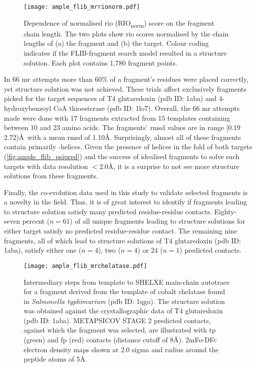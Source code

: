 \begin{figure}[H]
	\centering
	\texttt{[image: ample\_flib\_mrrionorm.pdf]}
	\caption[Relationship between fragment chain length and normalised RIO scores.]{Dependence of normalised \acrlong{rio} (RIO\textsubscript{norm}) score on the fragment chain length. The two plots show  \gls{rio} scores normalised by the chain lengths of (a) the fragment and (b) the target. Colour coding indicates if the FLIB-fragment search model resulted in a structure solution. Each plot contains 1,780 fragment points.}
	\label{fig:ample_flib_mrrionorm}
\end{figure}

In 66 \gls{mr} attempts more than 60\% of a fragment's residues were placed correctly, yet structure solution was not achieved. These trials affect exclusively fragments picked for the target sequences of T4 glutaredoxin (\gls{pdb} ID: 1aba) and 4-hydroxybenzoyl CoA thioesterase (\gls{pdb} ID: 1lo7). Overall, the 66 \gls{mr} attempts made were done with 17 fragments extracted from 15 templates containing between 10 and 23 amino acids. The fragments' \gls{rmsd} values are in range [0.19 2.72)\AA\ with a mean \gls{rmsd} of 1.10\AA. Surprisingly, almost all of these fragments contain primarily \textalpha-helices. Given the presence of helices in the fold of both targets (\cref{fig:ample_flib_psipred}) and the success of idealised fragments to solve such targets with data resolution $<2.0$\AA, it is a surprise to not see more structure solutions from these fragments.

Finally, the co-evolution data used in this study to validate selected fragments is a novelty in the field. Thus, it is of great interest to identify if fragments leading to structure solution satisfy many predicted residue-residue contacts. Eighty-seven percent ($n=61$) of all unique fragments leading to structure solutions for either target satisfy no predicted residue-residue contact. The remaining nine fragments, all of which lead to structure solutions of T4 glutaredoxin (\gls{pdb} ID: 1aba), satisfy either one ($n=4$), two ($n=4$) or 24 ($n=1$) predicted contacts. 

\begin{figure}[H]
	\centering
	\texttt{[image: ample\_flib\_mrchelatase.pdf]}
	\caption[Example of FLIB fragment to MR solution]{Intermediary steps from template to SHELXE main-chain autotrace for a fragment derived from the template of cobalt chelatase found in \textit{Salmonella typhimurium} (\gls{pdb} ID: 1qgo). The structure solution was obtained against the crystallographic data of T4 glutaredoxin (\gls{pdb} ID: 1aba). METAPSICOV STAGE 2 predicted contacts, against which the fragment was selected, are illustrated with \acrlong{tp} (green) and \acrlong{fp} (red) contacts (distance cutoff of 8\AA). 2mFo-DFc electron density maps shown at 2.0 sigma and radius around the peptide atoms of 5\AA.}
	\label{fig:ample_flib_mrchelatase}
\end{figure}


